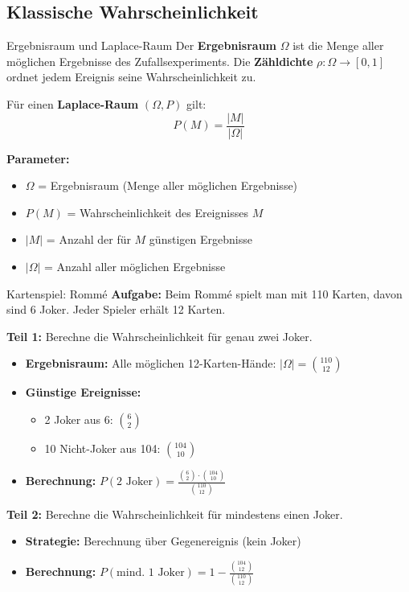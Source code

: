 \subsection{Klassische Wahrscheinlichkeit}

\begin{definition}{Ergebnisraum und Laplace-Raum}
Der \textbf{Ergebnisraum} $\Omega$ ist die Menge aller möglichen Ergebnisse des Zufallsexperiments. Die \textbf{Zähldichte} $\rho: \Omega \rightarrow[0,1]$ ordnet jedem Ereignis seine Wahrscheinlichkeit zu.

Für einen \textbf{Laplace-Raum} $(\Omega, P)$ gilt:
$$P(M)=\frac{|M|}{|\Omega|}$$

\textbf{Parameter:}
\begin{itemize}
    \item $\Omega$ = Ergebnisraum (Menge aller möglichen Ergebnisse)
    \item $P(M)$ = Wahrscheinlichkeit des Ereignisses $M$
    \item $|M|$ = Anzahl der für $M$ günstigen Ergebnisse
    \item $|\Omega|$ = Anzahl aller möglichen Ergebnisse
\end{itemize}
\end{definition}

\begin{example}{Kartenspiel: Rommé}
\textbf{Aufgabe:} Beim Rommé spielt man mit 110 Karten, davon sind 6 Joker. Jeder Spieler erhält 12 Karten.

\textbf{Teil 1:} Berechne die Wahrscheinlichkeit für genau zwei Joker.
\begin{itemize}
\item \textbf{Ergebnisraum:} Alle möglichen 12-Karten-Hände: $|\Omega| = \binom{110}{12}$
\item \textbf{Günstige Ereignisse:}
    \begin{itemize}
    \item 2 Joker aus 6: $\binom{6}{2}$
    \item 10 Nicht-Joker aus 104: $\binom{104}{10}$
    \end{itemize}
\item \textbf{Berechnung:} $P(\text{2 Joker}) = \frac{\binom{6}{2} \cdot \binom{104}{10}}{\binom{110}{12}}$
\end{itemize}

\textbf{Teil 2:} Berechne die Wahrscheinlichkeit für mindestens einen Joker.
\begin{itemize}
\item \textbf{Strategie:} Berechnung über Gegenereignis (kein Joker)
\item \textbf{Berechnung:} $P(\text{mind. 1 Joker}) = 1 - \frac{\binom{104}{12}}{\binom{110}{12}}$
\end{itemize}
\end{example}

